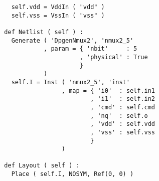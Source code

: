 \begin{itemize}
\begin{verbatim}
    self.vdd = VddIn ( "vdd" )
    self.vss = VssIn ( "vss" )
    
  def Netlist ( self ) :
    Generate ( 'DpgenNmux2', 'nmux2_5'
             , param = { 'nbit'     : 5
                       , 'physical' : True
                       }
             )
    self.I = Inst ( 'nmux2_5', 'inst'
                  , map = { 'i0'  : self.in1
                          , 'i1'  : self.in2
                          , 'cmd' : self.cmd
                          , 'nq'  : self.o
                          , 'vdd' : self.vdd
                          , 'vss' : self.vss
                          }
                  )
      
  def Layout ( self ) :
    Place ( self.I, NOSYM, Ref(0, 0) )
\end{verbatim}
\end{itemize}
